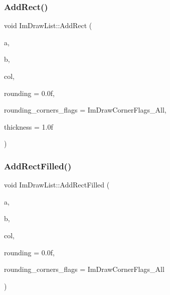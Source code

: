 \subsubsection{\texorpdfstring{Add\+Rect()}{AddRect()}}
{\footnotesize\ttfamily void Im\+Draw\+List\+::\+Add\+Rect (\begin{DoxyParamCaption}\item[{const \hyperlink{struct_im_vec2}{Im\+Vec2} \&}]{a,  }\item[{const \hyperlink{struct_im_vec2}{Im\+Vec2} \&}]{b,  }\item[{Im\+U32}]{col,  }\item[{float}]{rounding = {\ttfamily 0.0f},  }\item[{int}]{rounding\+\_\+corners\+\_\+flags = {\ttfamily ImDrawCornerFlags\+\_\+All},  }\item[{float}]{thickness = {\ttfamily 1.0f} }\end{DoxyParamCaption})}

\hypertarget{struct_im_draw_list_a6e8b2ae6cc8c905606e4400e4cfdeeeb}{}\label{struct_im_draw_list_a6e8b2ae6cc8c905606e4400e4cfdeeeb} 
\subsubsection{\texorpdfstring{Add\+Rect\+Filled()}{AddRectFilled()}}
{\footnotesize\ttfamily void Im\+Draw\+List\+::\+Add\+Rect\+Filled (\begin{DoxyParamCaption}\item[{const \hyperlink{struct_im_vec2}{Im\+Vec2} \&}]{a,  }\item[{const \hyperlink{struct_im_vec2}{Im\+Vec2} \&}]{b,  }\item[{Im\+U32}]{col,  }\item[{float}]{rounding = {\ttfamily 0.0f},  }\item[{int}]{rounding\+\_\+corners\+\_\+flags = {\ttfamily ImDrawCornerFlags\+\_\+All} }\end{DoxyParamCaption})}

\hypertarget{struct_im_draw_list_ab658e574f3ef67a8d6cc0a86f13f5176}{}\label{struct_im_draw_list_ab658e574f3ef67a8d6cc0a86f13f5176} 
